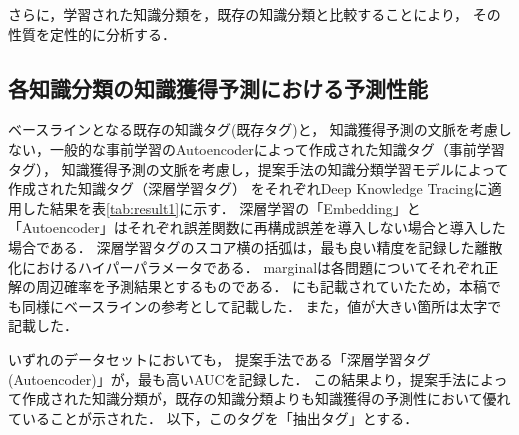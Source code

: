 さらに，学習された知識分類を，既存の知識分類と比較することにより，
その性質を定性的に分析する．



\subsection{各知識分類の知識獲得予測における予測性能}

\begin{table}[t]
\caption{各知識分類の知識獲得予測における予測性能}
\label{tab:result1}
\begin{center}
\end{center}
\end{table}


ベースラインとなる既存の知識タグ(既存タグ)と，
知識獲得予測の文脈を考慮しない，一般的な事前学習のAutoencoderによって作成された知識タグ（事前学習タグ），
知識獲得予測の文脈を考慮し，提案手法の知識分類学習モデルによって作成された知識タグ（深層学習タグ）
をそれぞれDeep Knowledge Tracingに適用した結果を表\ref{tab:result1}に示す．
深層学習の「Embedding」と「Autoencoder」はそれぞれ誤差関数に再構成誤差を導入しない場合と導入した場合である．
深層学習タグのスコア横の括弧は，最も良い精度を記録した離散化におけるハイパーパラメータである．
marginalは各問題についてそれぞれ正解の周辺確率を予測結果とするものである．
\cite{piech2015deep}にも記載されていたため，本稿でも同様にベースラインの参考として記載した．
また，値が大きい箇所は太字で記載した．

いずれのデータセットにおいても，
提案手法である「深層学習タグ(Autoencoder)」が，最も高いAUCを記録した．
この結果より，提案手法によって作成された知識分類が，既存の知識分類よりも知識獲得の予測性において優れていることが示された．
以下，このタグを「抽出タグ」とする．


